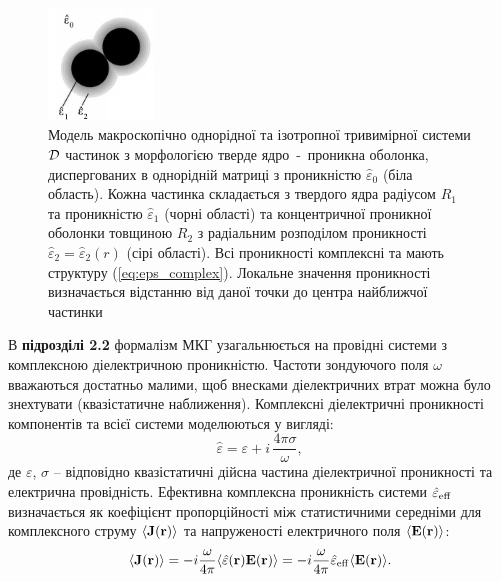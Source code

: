 \documentclass[twoside,a4paper,14pt]{vakaref}
\begin{document}
\begin{figure}
	\centering
	\includegraphics[width=0.25\textwidth]{particles-pen2.PNG}
	\caption{\label{fig:model-1layer}Модель макроскопічно однорідної та ізотропної тривимірної системи $\cal{D}$ частинок з морфологією тверде ядро~-~проникна оболонка, диспергованих в однорідній матриці з проникністю $\hat{\varepsilon}_0$ (біла область). Кожна частинка складається з твердого ядра радіусом $R_1$ та проникністю $\hat{\varepsilon}_1$ (чорні області) та концентричної проникної оболонки товщиною $R_2$ з радіальним розподілом проникності $\hat{\varepsilon}_2 = \hat{\varepsilon}_2(r)$ (сірі області). Всі проникності комплексні та мають структуру (\ref{eq:eps_complex}). Локальне значення проникності визначається відстанню від даної точки до центра найближчої частинки\vspace{-15pt}}
\end{figure}

В {\bf підрозділі 2.2} формалізм МКГ \cite{Sushko2007, Sushko2009, SushkoJPD2009, Sushko2017} узагальнюється на провідні системи з комплексною діелектричною проникністю. Частоти зондуючого поля $\omega$ вважаються достатньо малими, щоб внесками діелектричних втрат можна було знехтувати (квазістатичне наближення). Комплексні діелектричні проникності компонентів та всієї системи моделюються у вигляді:
\begin{equation}\label{eq:eps_complex}
\hat{\varepsilon} = \varepsilon + i\,\frac{4\pi\sigma}{\omega},
\end{equation}
де $\varepsilon$, $\sigma$ -- відповідно квазістатичні дійсна частина діелектричної проникності та електрична провідність. Ефективна комплексна проникність системи $\hat{\varepsilon}_{\rm eff}$ визначається як коефіцієнт пропорційності між статистичними середніми для комплексного струму $\langle {\bf J} ({\bf r}) \rangle$ та напруженості електричного поля $\langle {\bf E}({\bf r}) \rangle$:
\begin{equation}\label{eq:eff_complex}
\langle {\bf{J}} ({\bf{r}})\rangle =
-i\frac{\omega}{4\pi}\langle \hat{\varepsilon} ({\bf{r}}) {\bf{E}}
({\bf{r}}) \rangle = -i\frac{\omega}{4\pi} \hat{\varepsilon}_{\rm
	eff} \langle {\bf{E}} ({\bf{r}}) \rangle.
\end{equation}
\end{document}
